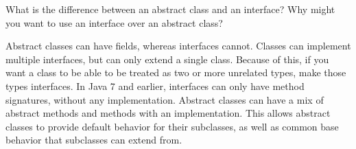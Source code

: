 What is the difference between an abstract class and an interface? Why might you want to use an interface over an abstract class? \\
\begin{answer}
Abstract classes can have fields, whereas interfaces cannot. Classes can implement multiple interfaces, but can only extend a single class. 
Because of this, if you want a class to be able to be treated as two or more unrelated types, make those types interfaces. 
In Java 7 and earlier, interfaces can only have method signatures, without any implementation. 
Abstract classes can have a mix of abstract methods and methods with an implementation. 
This allows abstract classes to provide default behavior for their subclasses, as well as common base behavior that subclasses can extend from.
\end{answer}
